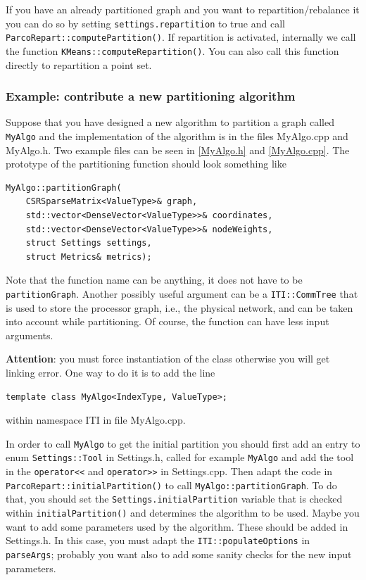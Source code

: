 \documentclass[a4paper,10pt]{article}
\newcommand{\att}{\textbf{Attention}: }
\newcommand{\MI}[1]{\texttt{#1}}
\begin{document}
If you have an already partitioned graph and you want to repartition/rebalance it you can do
so by setting \MI{settings.repartition} to true and call \MI{ParcoRepart::computePartition()}.
If repartition is activated, internally we call the function \MI{KMeans::computeRepartition()}.
You can also call this function directly to repartition a point set.

\subsubsection*{Example: contribute a new partitioning algorithm}

Suppose that you have designed a new algorithm to partition a graph called \MI{MyAlgo}
and the implementation of the algorithm is in the files MyAlgo.cpp and MyAlgo.h. Two example files
can be seen in \cref{MyAlgo.h} and \cref{MyAlgo.cpp}.
The prototype of the partitioning function should look something like
\begin{verbatim}
MyAlgo::partitionGraph( 
    CSRSparseMatrix<ValueType>& graph,
    std::vector<DenseVector<ValueType>>& coordinates,
    std::vector<DenseVector<ValueType>>& nodeWeights,
    struct Settings settings,
    struct Metrics& metrics);
\end{verbatim}

Note that the function name can be anything, it does not have to be \MI{partitionGraph}. Another 
possibly useful argument can be a \MI{ITI::CommTree} that is used to store the processor
graph, i.e., the physical network, and can be taken into account while partitioning. Of course,
the function can have less input arguments.


\att you must force instantiation of the class otherwise you will get linking error.
One way to do it is to add the line 
\begin{verbatim}
template class MyAlgo<IndexType, ValueType>;
\end{verbatim}
within namespace ITI in file MyAlgo.cpp.

In order to call \MI{MyAlgo} to get the initial partition you should first add an entry to enum
\MI{Settings::Tool} in Settings.h,
called for example \MI{MyAlgo} and add the tool in the \MI{operator<<} and \MI{operator>>} in
Settings.cpp.
Then adapt the code in \MI{ParcoRepart::initialPartition()} to call \MI{MyAlgo::partitionGraph}. 
To do that, you should set the \MI{Settings.initialPartition}
variable that is checked within \MI{initialPartition()} and determines the algorithm to be used.
Maybe you want to add some parameters used by the algorithm. These should be added in Settings.h.
In this case, you must adapt the \MI{ITI::populateOptions} in \MI{parseArgs}; probably you want also 
to add some sanity checks for the new input parameters.
\end{document}
